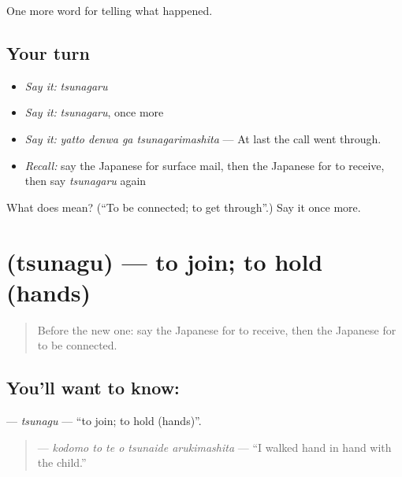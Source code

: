 \begin{grammarlens}[title={What you've built}]
One more word for telling what happened.
\end{grammarlens}

\subsection*{Your turn}
\begin{itemize}
\raggedright
  \item \emph{Say it:} \emph{tsunagaru}
  \item \emph{Say it:} \emph{tsunagaru}, once more
  \item \emph{Say it:} \emph{yatto denwa ga tsunagarimashita} — At last the call went through.
  \item \emph{Recall:} say the Japanese for surface mail, then the Japanese for to receive, then say \emph{tsunagaru} again
\end{itemize}

\begin{tcolorbox}[breakable,colback=teal!4,colframe=teal!35!black,title={Before you move on}]
What does  mean? (\textquotedblleft{}To be connected; to get through\textquotedblright{}.) Say it once more.
\end{tcolorbox}
\section[\texorpdfstring{\ja{つなぐ} (tsunagu)}{つなぐ (tsunagu)}]{ (tsunagu) — to join; to hold (hands)}

\label{lesson:JA-C307-tsunagu}



\begin{quote}
Before the new one: say the Japanese for to receive, then the Japanese for to be connected.
\end{quote}

\subsection*{You'll want to know: }
\textbf{} — \emph{tsunagu} — \textquotedblleft{}to join; to hold (hands)\textquotedblright{}.

\begin{quote}
\textbf{   } — \emph{kodomo to te o tsunaide arukimashita} — \textquotedblleft{}I walked hand in hand with the child.\textquotedblright{}
\end{quote}

